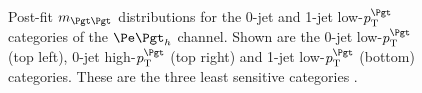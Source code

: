 \begin{figure}[tbh]


\caption[Post-fit $m_{\Pgt\Pgt}$ distributions for the 0-jet and 1-jet low-$\pt^{\Pgt}$ 
categories of the $\etau$ channel.]{Post-fit $m_{\Pgt\Pgt}$ distributions for
the 0-jet and 1-jet low-$\pt^{\Pgt}$ categories of the $\etau$ channel. Shown are the 0-jet
low-$\pt^{\Pgt}$ (top left), 0-jet high-$\pt^{\Pgt}$ (top right) and 1-jet
low-$\pt^{\Pgt}$ (bottom) categories. These are the three least sensitive categories \cite{HIG-13-004}.}
\label{fig:postfit0jet1jetetau}
\end{figure}

